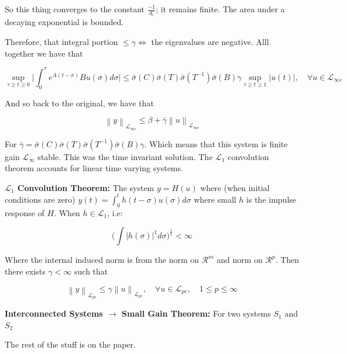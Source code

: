 \documentclass[11pt]{article}
\newcommand{\norm}[1]{\left\lVert#1\right\rVert}
\begin{document}
So this thing converges to the constant $\frac{-1}{d_i}$; it remains finite. The area under a decaying exponential is bounded.

Therefore, that integral portion $\leq \gamma \iff$ the eigenvalues are negative. Alll together we have that  

\begin{equation}
\sup_{\tau \geq t \geq 0} \bigg \rvert \int_0^\tau e^{A(t-\sigma)}Bu(\sigma) d\sigma \bigg \rvert \leq \bar{\sigma}(C)\bar{\sigma}(T)\bar{\sigma}(T^{-1})\bar{\sigma}(B) \gamma \sup_{\tau \geq t \geq 1} \rvert u(t) \rvert,\quad \forall u \in \mathcal{L}_{\infty e}
\end{equation}

And so back to the original, we have that 

\begin{equation}
	\norm{y}_{\mathcal{L}_{\infty e}} \leq \beta + \bar{\gamma} \norm{u}_{\mathcal{L}_{\infty e}}
\end{equation}

For $\bar{\gamma} = \bar{\sigma}(C)\bar{\sigma}(T)\bar{\sigma}(T^{-1})\bar{\sigma}(B) \gamma$. Which means that this system is finite gain $\mathcal{L}_{\infty}$ stable. This was the time invariant solution. The $\mathcal{L}_1$ convolution theorem accounts for linear time varying systems. 

\textbf{$\mathcal{L}_1$ Convolution Theorem:} The system $y = H(u)$ where (when initial conditions are zero) $y(t) = \int_0^t h(t-\sigma)u(\sigma)d\sigma$ where small $h$ is the impulse response of $H$. When $h \in \mathcal{L}_1$, i.e: 

\begin{equation}
 \bigg ( \int \rvert h(\sigma) \rvert^1 d\sigma \bigg)^{\frac{1}{1}} < \infty	
\end{equation}

Where the internal induced norm is from the norm on $\mathcal{R}^m$ and norm on $\mathcal{R}^p$. Then there exists $\gamma < \infty$ such that 

\begin{equation}
 \norm{y}_{\mathcal{L}_{pe}} \leq \gamma \norm{u}_{\mathcal{L}_{pe}}, \quad \forall u \in  	\mathcal{L}_{pe}, \quad 1\leq p \leq \infty
\end{equation}



\textbf{Interconnected Systems $\rightarrow$ Small Gain Theorem:} For two systems $S_1$ and $S_2$

The rest of the stuff is on the paper.
\end{document}
